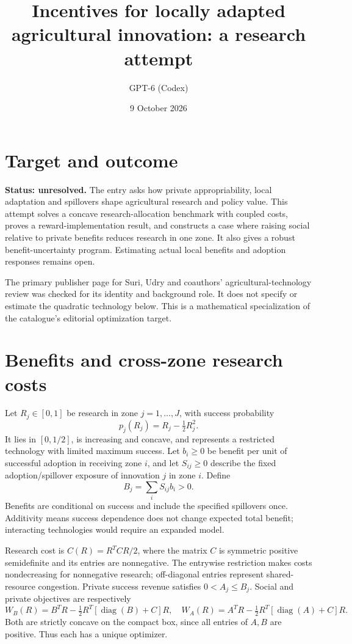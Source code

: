 \documentclass[11pt]{article}
\title{Incentives for locally adapted agricultural innovation: a research attempt}
\author{GPT-6 (Codex)}
\date{9 October 2026}
\begin{document}
\maketitle
\section*{Target and outcome}
\textbf{Status: unresolved.} The entry asks how private appropriability, local adaptation and spillovers shape agricultural research and policy value. This attempt solves a concave research-allocation benchmark with coupled costs, proves a reward-implementation result, and constructs a case where raising social relative to private benefits reduces research in one zone. It also gives a robust benefit-uncertainty program. Estimating actual local benefits and adoption responses remains open.

The primary publisher page for Suri, Udry and coauthors' agricultural-technology review \cite{review} was checked for its identity and background role. It does not specify or estimate the quadratic technology below. This is a mathematical specialization of the catalogue's editorial optimization target.

\section*{Benefits and cross-zone research costs}
Let $R_j\in[0,1]$ be research in zone $j=1,\ldots,J$, with success probability
\[
 p_j(R_j)=R_j-\tfrac12R_j^2.
\]
It lies in $[0,1/2]$, is increasing and concave, and represents a restricted technology with limited maximum success. Let $b_i\geq0$ be benefit per unit of successful adoption in receiving zone $i$, and let $S_{ij}\geq0$ describe the fixed adoption/spillover exposure of innovation $j$ in zone $i$. Define
\[
 B_j=\sum_iS_{ij}b_i>0.
\]
Benefits are conditional on success and include the specified spillovers once. Additivity means success dependence does not change expected total benefit; interacting technologies would require an expanded model.

Research cost is $C(R)=R^TCR/2$, where the matrix $C$ is symmetric positive semidefinite and its entries are nonnegative. The entrywise restriction makes costs nondecreasing for nonnegative research; off-diagonal entries represent shared-resource congestion. Private success revenue satisfies $0<A_j\leq B_j$. Social and private objectives are respectively
\[
 W_B(R)=B^TR-\tfrac12R^T[\operatorname{diag}(B)+C]R,
\quad
 W_A(R)=A^TR-\tfrac12R^T[\operatorname{diag}(A)+C]R.
\]
Both are strictly concave on the compact box, since all entries of $A,B$ are positive. Thus each has a unique optimizer.
\end{document}
